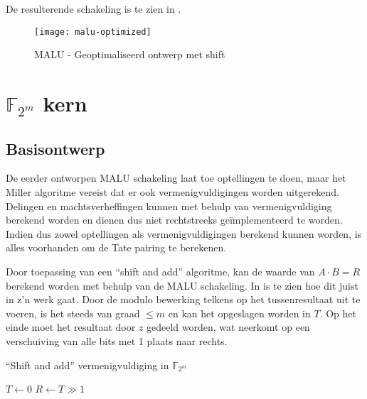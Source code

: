 De resulterende schakeling is te zien in .

\begin{figure}[h]
	\centering
		\texttt{[image: malu-optimized]}
		\caption{MALU - Geoptimaliseerd ontwerp met shift\label{figuur-implementatie-malu-optimized}}
\end{figure}

\section{$\mathbb{F}_{2^m}$\label{sectie-implementatie-gf2m} kern}

\subsection{Basisontwerp\label{subsectie-implementatie-gf2m-basisontwerp}}

De eerder ontworpen MALU schakeling laat toe optellingen te doen, maar het Miller algoritme vereist dat er ook vermenigvuldigingen worden uitgerekend. Delingen en machtsverheffingen kunnen met behulp van vermenigvuldiging berekend worden en dienen dus niet rechtstreeks ge\"implementeerd te worden. Indien dus zowel optellingen als vermenigvuldigingen berekend kunnen worden, is alles voorhanden om de Tate pairing te berekenen.

Door toepassing van een ``shift and add'' algoritme, kan de waarde van \mbox{$A \cdot B = R$} berekend worden met behulp van de MALU schakeling. In  is te zien hoe dit juist in z'n werk gaat. Door de modulo bewerking telkens op het tussenresultaat uit te voeren, is het steeds van graad $\leq m$ en kan het opgeslagen worden in $T$. Op het einde moet het resultaat door $z$ gedeeld worden, wat neerkomt op een verschuiving van alle bits met 1 plaats naar rechts.

\begin{algorithm}[h]
	\caption{``Shift and add'' vermenigvuldiging in $\mathbb{F}_{2^m}$}
	\label{algoritme-implementatie-gf2m-multiply}

	$T \gets 0$\;
	$R \gets T \gg 1$\;
\end{algorithm}

